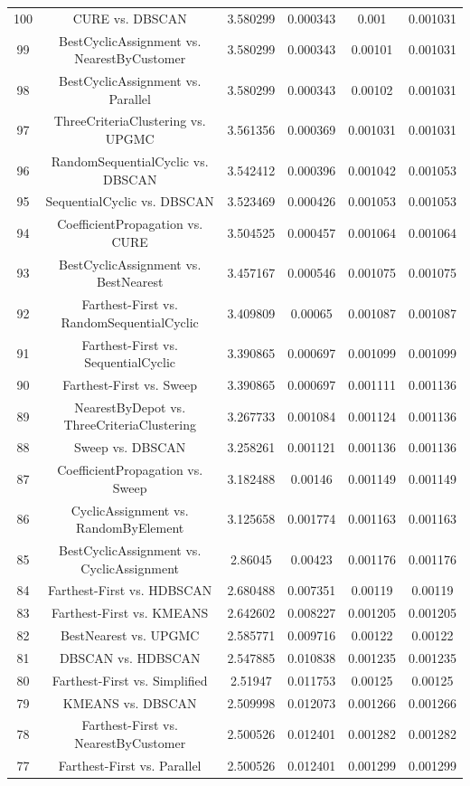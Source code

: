 \documentclass[a4paper,10pt]{article}
\begin{document}
\begin{landscape}
\begin{table}[!htp]
\begin{tabular}{cccccc}
100&CURE vs. DBSCAN&3.580299&0.000343&0.001&0.001031\\
99&BestCyclicAssignment vs. NearestByCustomer&3.580299&0.000343&0.00101&0.001031\\
98&BestCyclicAssignment vs. Parallel&3.580299&0.000343&0.00102&0.001031\\
97&ThreeCriteriaClustering vs. UPGMC&3.561356&0.000369&0.001031&0.001031\\
96&RandomSequentialCyclic vs. DBSCAN&3.542412&0.000396&0.001042&0.001053\\
95&SequentialCyclic vs. DBSCAN&3.523469&0.000426&0.001053&0.001053\\
94&CoefficientPropagation vs. CURE&3.504525&0.000457&0.001064&0.001064\\
93&BestCyclicAssignment vs. BestNearest&3.457167&0.000546&0.001075&0.001075\\
92&Farthest-First vs. RandomSequentialCyclic&3.409809&0.00065&0.001087&0.001087\\
91&Farthest-First vs. SequentialCyclic&3.390865&0.000697&0.001099&0.001099\\
90&Farthest-First vs. Sweep&3.390865&0.000697&0.001111&0.001136\\
89&NearestByDepot vs. ThreeCriteriaClustering&3.267733&0.001084&0.001124&0.001136\\
88&Sweep vs. DBSCAN&3.258261&0.001121&0.001136&0.001136\\
87&CoefficientPropagation vs. Sweep&3.182488&0.00146&0.001149&0.001149\\
86&CyclicAssignment vs. RandomByElement&3.125658&0.001774&0.001163&0.001163\\
85&BestCyclicAssignment vs. CyclicAssignment&2.86045&0.00423&0.001176&0.001176\\
84&Farthest-First vs. HDBSCAN&2.680488&0.007351&0.00119&0.00119\\
83&Farthest-First vs. KMEANS&2.642602&0.008227&0.001205&0.001205\\
82&BestNearest vs. UPGMC&2.585771&0.009716&0.00122&0.00122\\
81&DBSCAN vs. HDBSCAN&2.547885&0.010838&0.001235&0.001235\\
80&Farthest-First vs. Simplified&2.51947&0.011753&0.00125&0.00125\\
79&KMEANS vs. DBSCAN&2.509998&0.012073&0.001266&0.001266\\
78&Farthest-First vs. NearestByCustomer&2.500526&0.012401&0.001282&0.001282\\
77&Farthest-First vs. Parallel&2.500526&0.012401&0.001299&0.001299\\

\end{tabular}
\end{table}
\end{landscape}
\end{document}
